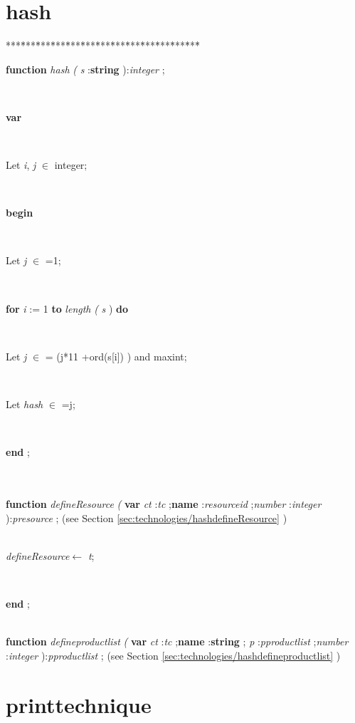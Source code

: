 \section{hash}\label{sec:technologieshash}

\begin{tabbing}
***\=***\=***\=***\=***\=***\=***\=***\=***\=***\=***\=***\=***\=\kill
\parbox{14cm}{\textsf{\textbf{function}  \textit{hash} \textit{(} \textit{s} :\textbf{string} ):\textit{integer} ;}}\\
\+\parbox{14cm}{\textsf{\textbf{var} }}\\
\parbox{14cm}{\textsf{Let \textit{i}, \textit{j} $\in$ integer;}}\\
\-\<\+\parbox{14cm}{\textsf{\textbf{begin} }}\\
\parbox{14cm}{\textsf{Let \textit{j} $\in$ =1;}}\\
\+\parbox{14cm}{\textsf {\textbf {for } \textsf{ \textit{i} := 1 } \textbf{ to } \textsf{ \textit{length} \textit{(} \textit{s} ) } \textbf{ do } }}\\
\-\parbox{14cm}{\textsf{Let \textit{j} $\in$ = (j*11 +ord(s[i]) ) and maxint;}}\\
\parbox{14cm}{\textsf{Let \textit{hash} $\in$ =j;}}\\
\<\-\parbox{14cm}{\textsf{\textbf{end} ;}}\\
\\
\+\textsf{\textbf{function}   \textit{defineResource} \textit{(} \textbf{var}  \textit{ct} :\textit{tc} ;\textbf{name} :\textit{resourceid} ;\textit{number} :\textit{integer} ):\textit{presource} ;} (see Section \ref{sec:technologies/hashdefineResource} )\\
\\
\parbox{14cm}{\textsf{\textit{defineResource}$\leftarrow$ \textit{t}}; }\\
\<\-\parbox{14cm}{\textsf{\textbf{end} ;}}\\
\textsf{\textbf{function}   \textit{defineproductlist} \textit{(} \textbf{var}  \textit{ct} :\textit{tc} ;\textbf{name} :\textbf{string} ; \textit{p} :\textit{pproductlist} ;\textit{number} :\textit{integer} ):\textit{pproductlist} ;} (see Section \ref{sec:technologies/hashdefineproductlist} )\\
\end{tabbing}
\section{printtechnique}\label{sec:technologies/logComplexprinttechnique}

